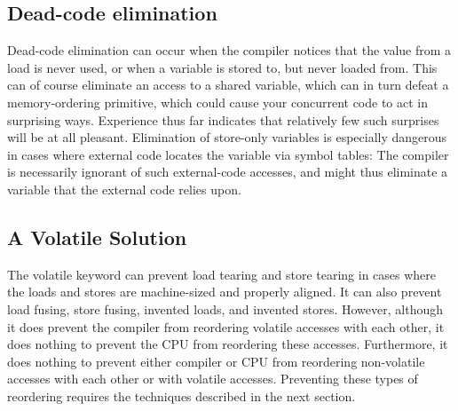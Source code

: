 \subsection{Dead-code elimination}
Dead-code elimination can occur when the compiler notices that the
value from a load is never used, or when a variable is stored to, but never
loaded from. This can of course eliminate an access to a shared variable,
which can in turn defeat a memory-ordering primitive, which could cause
your concurrent code to act in surprising ways. Experience thus far indicates
that relatively few such surprises will be at all pleasant. Elimination of
store-only variables is especially dangerous in cases where external code
locates the variable via symbol tables: The compiler is necessarily ignorant
of such external-code accesses, and might thus eliminate a variable that the
external code relies upon.


\subsection{A Volatile Solution}

The volatile keyword can prevent load tearing and store
tearing in cases where the loads and stores are machine-sized and properly
aligned. It can also prevent load fusing, store fusing, invented loads, and
invented stores. However, although it does prevent the compiler from
reordering volatile accesses with each other, it does nothing to prevent
the CPU from reordering these accesses. Furthermore, it does nothing to
prevent either compiler or CPU from reordering non-volatile accesses
with each other or with volatile accesses. Preventing these types of
reordering requires the techniques described in the next section.

